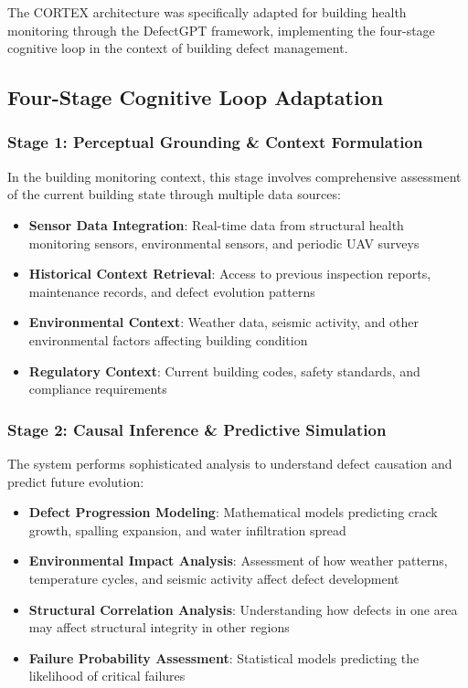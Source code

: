 The CORTEX architecture was specifically adapted for building health monitoring through the DefectGPT framework, implementing the four-stage cognitive loop in the context of building defect management.

\subsection{Four-Stage Cognitive Loop Adaptation}

\subsubsection{Stage 1: Perceptual Grounding \& Context Formulation}

In the building monitoring context, this stage involves comprehensive assessment of the current building state through multiple data sources:

\begin{itemize}
    \item \textbf{Sensor Data Integration}: Real-time data from structural health monitoring sensors, environmental sensors, and periodic UAV surveys
    \item \textbf{Historical Context Retrieval}: Access to previous inspection reports, maintenance records, and defect evolution patterns
    \item \textbf{Environmental Context}: Weather data, seismic activity, and other environmental factors affecting building condition
    \item \textbf{Regulatory Context}: Current building codes, safety standards, and compliance requirements
\end{itemize}

\subsubsection{Stage 2: Causal Inference \& Predictive Simulation}

The system performs sophisticated analysis to understand defect causation and predict future evolution:

\begin{itemize}
    \item \textbf{Defect Progression Modeling}: Mathematical models predicting crack growth, spalling expansion, and water infiltration spread
    \item \textbf{Environmental Impact Analysis}: Assessment of how weather patterns, temperature cycles, and seismic activity affect defect development
    \item \textbf{Structural Correlation Analysis}: Understanding how defects in one area may affect structural integrity in other regions
    \item \textbf{Failure Probability Assessment}: Statistical models predicting the likelihood of critical failures
\end{itemize}

